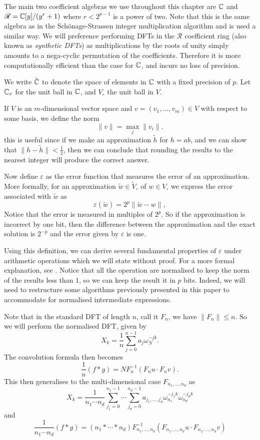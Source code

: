 The main two coefficient algebras we use throughout this chapter are ${\mathbb C}$ and $\mathscr{R} = {\mathbb C}[y]/(y^r + 1)$ where $r < 2^{p-1}$ is a power of two. Note that this is the same algebra as in the Sch\"{o}nage-Strassen integer multiplication algorithm and is used a similar way.
We will preference performing DFTs in the $\mathscr{R}$ coefficient ring (also known as \textit{synthetic DFTs}) as multiplications by the roots of unity simply amounts to a nega-cyclic permutation of the coefficients. Therefore it is more computationally efficient than the case for ${\mathbb C}$, and incurs no loss of precision.

We write $\tilde{{\mathbb C}}$ to denote the space of elements in ${\mathbb C}$ with a fixed precision of $p$. Let ${\mathbb C}_\circ$ for the unit ball in ${\mathbb C}$, and $V_\circ$ the unit ball in $V$.

If $V$ is an $m$-dimensional vector space and $v = (v_1, \ldots, v_m) \in V$ with respect to some basis, we define the norm
\[
    \|v\| = \max_j \|v_i\|.
\]
this is useful since if we make an approximation $\tilde{h}$ for $h = ab$, and we can show that $\|h - \tilde{h}\| < \frac{1}{2}$, then we can conclude that rounding the results to the nearest integer will produce the correct answer.

Now define $\varepsilon$ as the error function that measures the error of an approximation. More formally, for an approximation $\tilde{w} \in \tilde{V}_\circ$ of $w \in V_\circ$ we express the error associated with $\tilde{w}$ as
\[
    \varepsilon(\tilde{w}) = 2^p \|\tilde{w} - w\|,
\]
Notice that the error is measured in multiples of $2^p$. So if the approximation is incorrect by one bit, then the difference between the approximation and the exact solution is $2^{-p}$ and the error given by $\varepsilon$ is one.

Using this definition, we can derive several fundamental properties of $\varepsilon$ under arithmetic operations which we will state without proof. For a more formal explanation, see \cite{nlogn}. Notice that all the operation are normalised to keep the norm of the results less than $1$, so we can keep the result it in $p$ bits. Indeed, we will need to restructure some algorithms previously presented in this paper to accommodate for normalised intermediate expressions.

Note that in the standard DFT of length $n$, call it $F_n$, we have $\|F_n\| \le n$. So we will perform the normalised DFT, given by
\[
    X_k = \frac{1}{n} \sum^{n-1}_{j=0} a_j \omega_N^{-jk}.
\]
The convolution formula then becomes
\[
    \frac{1}{n} (f \ast g) = NF_n^{-1} (F_n u \cdot F_n v).
\]
This then generalises to the multi-dimensional case $F_{n_1, \ldots, n_d}$ as
\[
    X_k = \frac{1}{n_1\cdots n_d} \sum^{n_1-1}_{j_1=0} \cdots \sum^{n_d-1}_{j_d=0} a_{j_1, \ldots, j_d} \omega_{n_1}^{-j_1 k} \omega_{n_d}^{-j_d k}
\]
and
\begin{equation}\label{eq:normalised-convolution}
    \frac{1}{n_1 \cdots n_d} (f \ast g) = (n_1 \ast \cdots \ast n_d)F_{n_1, \ldots, n_d}^{-1} (F_{n_1, \ldots, n_d} u \cdot F_{n_1, \ldots, n_d} v)
\end{equation}

